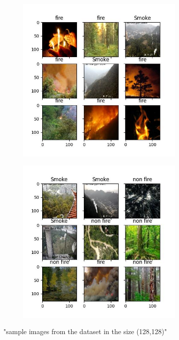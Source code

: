 \documentclass[]{article}
\begin{document}
\begin{figure}[H]
	\centering
	\begin{subfigure}{0.9\textwidth}
		\includegraphics[width=0.9\textwidth]{"../visualizations/data_insights/sample_images1.jpg"}
	\end{subfigure}
	\begin{subfigure}{0.9\textwidth}
		\includegraphics[width=0.9\textwidth]{"../visualizations/data_insights/sample_images.jpg"}
	\end{subfigure}
	\caption{"sample images from the dataset in the size (128,128)"}
\end{figure}
\end{document}
